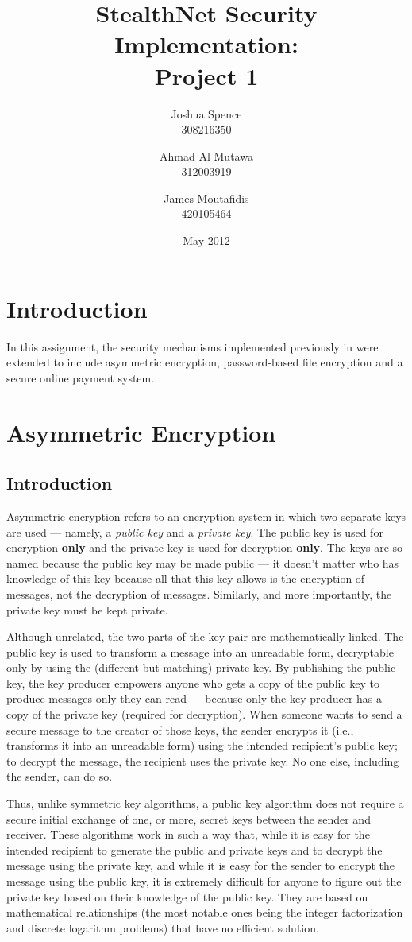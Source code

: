 \documentclass[a4paper,11pt]{article}
\title{StealthNet Security Implementation: \\ Project 1}
\author{Joshua Spence \\ 308216350 \and Ahmad Al Mutawa \\ 312003919 \and James Moutafidis \\ 420105464}
\date{May 2012}
\begin{document}
\maketitle

\section{Introduction}
In this assignment, the security mechanisms implemented previously in 
\packageName{} were extended to include asymmetric encryption, password-based 
file encryption and a secure online payment system.

\section{Asymmetric Encryption}

\subsection{Introduction}
Asymmetric encryption refers to an encryption system in which two separate keys 
are used --- namely, a \emph{public key} and a \emph{private key}. The public 
key is used for encryption \textbf{only} and the private key is used for
decryption \textbf{only}. The keys are so named because the public key may be 
made public --- it doesn't matter who has knowledge of this key because all that
this key allows is the encryption of messages, not the decryption of messages. 
Similarly, and more importantly, the private key must be kept private.

Although unrelated, the two parts of the key pair are mathematically linked. The
public key is used to transform a message into an unreadable form, decryptable 
only by using the (different but matching) private key. By publishing the public
key, the key producer empowers anyone who gets a copy of the public key to 
produce messages only they can read --- because only the key producer has a copy
of the private key (required for decryption). When someone wants to send a 
secure message to the creator of those keys, the sender encrypts it (i.e., 
transforms it into an unreadable form) using the intended recipient's public 
key; to decrypt the message, the recipient uses the private key. No one else, 
including the sender, can do so.

Thus, unlike symmetric key algorithms, a public key algorithm does not require a
secure initial exchange of one, or more, secret keys between the sender and 
receiver. These algorithms work in such a way that, while it is easy for the 
intended recipient to generate the public and private keys and to decrypt the 
message using the private key, and while it is easy for the sender to encrypt 
the message using the public key, it is extremely difficult for anyone to figure
out the private key based on their knowledge of the public key. They are based 
on mathematical relationships (the most notable ones being the integer 
factorization and discrete logarithm problems) that have no efficient solution.
\end{document}
